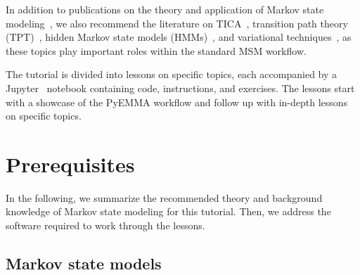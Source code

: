 \documentclass[9pt,tutorial]{livecoms}
\begin{document}
In addition to publications on the theory and application of Markov state modeling~\cite{schuette-msm,buchete-msm-2008,noe-tmat-sampling,bowman-msm-2009,noe-folding-pathways,sarich-msm-quality,noe-fingerprints,noe-dy-neut-scatt,Chodera2014,ben-rev-msm,simon-mech-mod-nmr,oom-feliks,simon-amm},
we also recommend the literature on TICA~\cite{tica,tica3,kinetic-maps,tica2},
transition path theory (TPT)~\cite{weinan-tpt,metzner-msm-tpt},
hidden Markov state models (HMMs)~\cite{noe-proj-hid-msm,jhp-spectral-rate-theory,bhmm-preprint},
and variational techniques~\cite{noe-vac,vamp-preprint,gmrq},
as these topics play important roles within the standard MSM workflow.

The tutorial is divided into lessons on specific topics, each accompanied by a Jupyter~\cite{jupyter} notebook containing code, instructions, and exercises.
The lessons start with a showcase of the PyEMMA workflow and follow up with in-depth lessons on specific topics.

\section{Prerequisites}

In the following, we summarize the recommended theory and background knowledge of Markov state modeling for this tutorial.
Then, we address the software required to work through the lessons.

\subsection{Markov state models}
\label{sec:theory}
\end{document}
